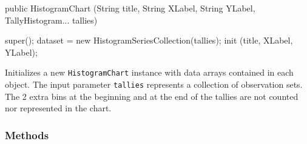 \begin{htmlonly}
\end{htmlonly}
\begin{code}

    public HistogramChart (String title, String XLabel, String YLabel,
                           TallyHistogram... tallies) \begin{hide} {
      super();
      dataset = new HistogramSeriesCollection(tallies);
      init (title, XLabel, YLabel);
   }\end{hide}
\end{code}
\begin{tabb}
   Initializes a new \texttt{HistogramChart} instance with data arrays
   contained in each
    object.
   The input parameter \texttt{tallies} represents a collection
   of observation sets. The 2 extra bins at the beginning and at the end of the
 tallies are not counted nor represented in the chart.
\end{tabb}
\begin{htmlonly}
\end{htmlonly}


\subsubsection*{Methods}

